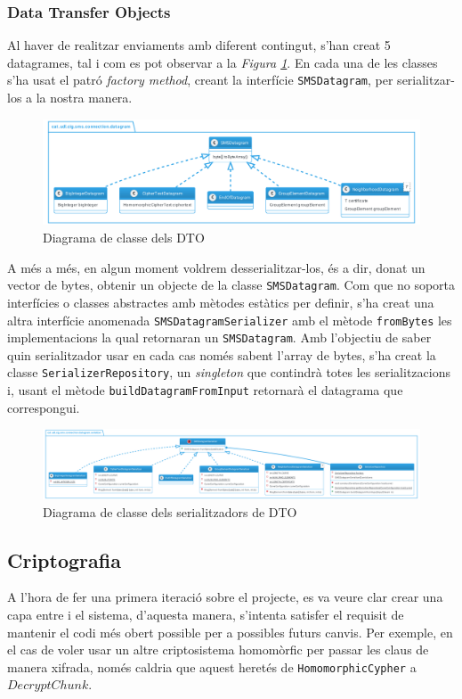 \subsubsection{Data Transfer Objects}
Al haver de realitzar enviaments amb diferent contingut, s'han creat 5 datagrames, tal i com es pot observar a la \textit{Figura \ref{fig:dto}}. En cada una de les classes s'ha usat el patró \textit{factory method}, creant la interfície \texttt{SMSDatagram}, per serialitzar-los a la nostra manera.
\begin{figure}[H]
	\includegraphics[width=15cm]{classes/dto.png}
	\caption{Diagrama de classe dels DTO}
	\label{fig:dto}
\end{figure}
A més a més, en algun moment voldrem desserialitzar-los, és a dir, donat un vector de bytes, obtenir un objecte de la classe \texttt{SMSDatagram}. Com que \texttt{\java } no soporta interfícies o classes abstractes amb mètodes estàtics per definir, s'ha creat una altra interfície anomenada \texttt{SMSDatagramSerializer} amb el mètode \texttt{fromBytes} les implementacions la qual retornaran un \texttt{SMSDatagram}. Amb l'objectiu de saber quin serialitzador usar en cada cas només sabent l'array de bytes, s'ha creat la classe \texttt{SerializerRepository}, un \textit{singleton} que contindrà totes les serialitzacions i, usant el mètode \texttt{buildDatagramFromInput} retornarà el datagrama que correspongui.
\begin{figure}[H]
	\includegraphics[width=16cm]{classes/dtoser.png}
	\caption{Diagrama de classe dels serialitzadors de DTO}
	\label{fig:dtoser}
\end{figure}


\subsection{Criptografia}
A l'hora de fer una primera iteració sobre el projecte, es va veure clar crear una capa entre \ciglib i el sistema, d'aquesta manera, s'intenta satisfer el requisit de mantenir el codi més obert possible per a possibles futurs canvis. Per exemple, en el cas de voler usar un altre criptosistema homomòrfic per passar les claus de manera xifrada, només caldria que aquest heretés de \texttt{HomomorphicCypher} a $DecryptChunk$. 
